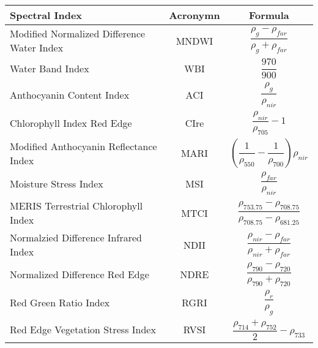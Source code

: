 \begin{sidewaystable}[p]
  \contcaption
  \begin{center}
  \begin{tabular}{lcc}\hline
  \textbf{Spectral Index} & \textbf{Acronymn} & \textbf{Formula} \\ \hline
  Modified Normalized Difference Water Index & MNDWI & $\dfrac{\rho_g - \rho_{far}}{\rho_g + \rho_{far}}$ \\
  Water Band Index & WBI & $\dfrac{970}{900}$ \\
  Anthocyanin Content Index & ACI & $\dfrac{\rho_g}{\rho_{nir}}$ \\
  Chlorophyll Index Red Edge & CIre & $\dfrac{\rho_{nir}}{\rho_{705}} - 1$ \\
  Modified Anthocyanin Reflectance Index & MARI & $\left(\dfrac{1}{\rho_{550}} - \dfrac{1}{\rho_{700}} \right)\rho_{nir}$ \\
  Moisture Stress Index & MSI & $\dfrac{\rho_{far}}{\rho_{nir}}$ \\
  MERIS Terrestrial Chlorophyll Index & MTCI & $\dfrac{\rho_{753.75} - \rho_{708.75}}{\rho_{708.75} - \rho_{681.25}}$ \\
  Normalzied Difference Infrared Index & NDII & $\dfrac{\rho_{nir} - \rho_{far}}{\rho_{nir} + \rho_{far}}$ \\
  Normalized Difference Red Edge & NDRE & $\dfrac{\rho_{790} - \rho_{720}}{\rho_{790} + \rho_{720}}$ \\
  Red Green Ratio Index & RGRI & $\dfrac{\rho_r}{\rho_g}$ \\
  Red Edge Vegetation Stress Index & RVSI & $\dfrac{\rho_{714} + \rho_{752}}{2} - \rho_{733}$
  \end{tabular}
  \end{center}
\end{sidewaystable}





